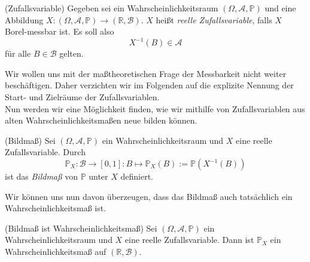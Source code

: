\begin{Definition}{(Zufallsvariable)}
Gegeben sei ein Wahrscheinlichkeitsraum $(\Omega, \mathscr{A}, \mathbb{P})$ und eine Abbildung $X: (\Omega, \mathscr{A}, \mathbb{P}) \rightarrow (\mathbb{R}, \mathscr{B})$. $X$ heißt \textit{reelle Zufallsvariable}, falls $X$ Borel-messbar ist. Es soll also
\[X^{-1}(B) \in \mathscr{A}\]
für alle $B \in \mathscr{B}$ gelten.
\end{Definition}

Wir wollen uns mit der maßtheoretischen Frage der Messbarkeit nicht weiter beschäftigen. Daher verzichten wir im Folgenden auf die explizite Nennung der Start- und Zielräume der Zufallsvariablen.\\

Nun werden wir eine Möglichkeit finden, wie wir mithilfe von Zufallsvariablen aus alten Wahrscheinlichkeitsmaßen neue bilden können.

\begin{Definition}{(Bildmaß)}
Sei $(\Omega, \mathscr{A}, \mathbb{P})$ ein Wahrscheinlichkeitsraum und $X$ eine reelle Zufallsvariable. Durch 
\[\mathbb{P}_X: \mathscr{B} \rightarrow [0, 1]: B \mapsto \mathbb{P}_X(B) := \mathbb{P}(X^{-1}(B))\]
ist das \textit{Bildmaß} von $\mathbb{P}$ unter $X$ definiert.
\end{Definition}

Wir können uns nun davon überzeugen, dass das Bildmaß auch tatsächlich ein Wahrscheinlichkeitsmaß ist.

\begin{Satz}{(Bildmaß ist Wahrscheinlichkeitsmaß)}
Sei $(\Omega, \mathscr{A}, \mathbb{P})$ ein Wahrscheinlichkeitsraum und $X$ eine reelle Zufallsvariable. Dann ist $\mathbb{P}_X$ ein Wahrscheinlichkeitsmaß auf $(\mathbb{R}, \mathscr{B})$.
\end{Satz}

